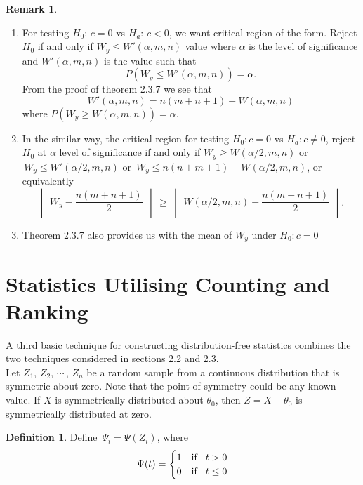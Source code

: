 \documentclass[12pt,a4paper]{report}
\theoremstyle{definition}
\newtheorem{defn}[thm]{Definition}
\newtheorem{remark}[thm]{Remark}
\theoremstyle{plain}
\begin{document}
\begin{remark}
\begin{enumerate}
\item For testing $H_0:\, c = 0$ vs $H_a:\, c < 0$, we want critical region of the form. Reject $H_0$ if and only if $W_y \leq W'(\alpha, m, n)$ value where $\alpha$ is the level of significance and $W'(\alpha, m, n)$ is the value such that $$P\left(W_y \leq W'(\alpha, m, n)\right) = \alpha.$$
From the proof of theorem 2.3.7 we see that
$$W'(\alpha, m, n) = n(m + n + 1) - W(\alpha, m , n)$$
where $P\left(W_y\geq W(\alpha, m, n)\right) = \alpha$.
\item In the similar way, the critical region for testing $H_0: c =  0$ vs $H_a: c \neq 0$, reject $H_0$ at $\alpha$ level of significance if and only if $W_y \geq W(\alpha/2, m , n)$ or $\, W_y \leq W'(\alpha/2, m, n)$ or $\, W_y \leq n(n + m  + 1) - W(\alpha/2, m , n)$, or equivalently
$$\begin{vmatrix}
W_y - \dfrac{n(m + n + 1)}{2}\\
\end{vmatrix}\, \geq \, \begin{vmatrix}
W(\alpha/2, m , n) - \dfrac{n(m + n + 1)}{2}\\
\end{vmatrix}.$$
\item Theorem 2.3.7 also provides us with the mean of $W_y$ under $H_0: c = 0$
\end{enumerate}
\end{remark}



\section{Statistics Utilising Counting and Ranking}
A third basic technique for constructing distribution-free statistics combines the two techniques considered in sections 2.2 and 2.3.\\
Let $Z_1, \, Z_2, \, \cdots\, , \, Z_n$ be a random sample from a continuous distribution that is symmetric about zero. Note that the point of symmetry could be any known value. If $X$ is symmetrically distributed about $\theta_0$, then $Z = X - \theta_0$ is symmetrically distributed at zero.


\begin{defn}
Define $\, \Psi_i = \Psi(Z_i)$, where 
$$\Psi (t) = \begin{cases}
1 & \text{if}\hspace{0.3cm} t > 0\\
0 & \text{if}\hspace{0.3cm} t \leq 0\\
\end{cases}$$
\end{defn}
\end{document}
